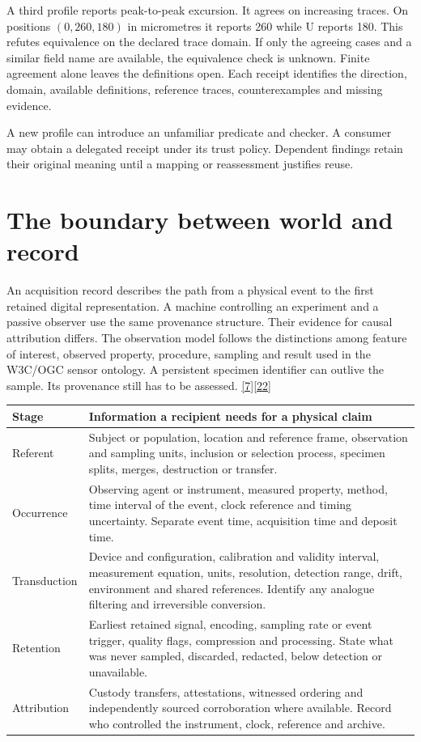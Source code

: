 \documentclass[11pt,a4paper]{article}
\newcommand{\partpage}[1]{\clearpage\section{#1}}
\newcommand{\src}[1]{\hyperlink{ref#1}{[#1]}}
\begin{document}
A third profile reports peak-to-peak excursion. It agrees on increasing traces. On positions $(0,260,180)$ in micrometres it reports 260 while U reports 180. This refutes equivalence on the declared trace domain. If only the agreeing cases and a similar field name are available, the equivalence check is unknown. Finite agreement alone leaves the definitions open. Each receipt identifies the direction, domain, available definitions, reference traces, counterexamples and missing evidence.

A new profile can introduce an unfamiliar predicate and checker. A consumer may obtain a delegated receipt under its trust policy. Dependent findings retain their original meaning until a mapping or reassessment justifies reuse.

\partpage{The boundary between world and record}
An acquisition record describes the path from a physical event to the first retained digital representation. A machine controlling an experiment and a passive observer use the same provenance structure. Their evidence for causal attribution differs. The observation model follows the distinctions among feature of interest, observed property, procedure, sampling and result used in the W3C/OGC sensor ontology. A persistent specimen identifier can outlive the sample. Its provenance still has to be assessed. \src{7}\src{22}

\small
\begin{tabularx}{\linewidth}{@{}L{.21\linewidth}Y@{}}
\toprule
\textbf{Stage} & \textbf{Information a recipient needs for a physical claim} \\ \midrule
Referent & Subject or population, location and reference frame, observation and sampling units, inclusion or selection process, specimen splits, merges, destruction or transfer. \\
Occurrence & Observing agent or instrument, measured property, method, time interval of the event, clock reference and timing uncertainty. Separate event time, acquisition time and deposit time. \\
Transduction & Device and configuration, calibration and validity interval, measurement equation, units, resolution, detection range, drift, environment and shared references. Identify any analogue filtering and irreversible conversion. \\
Retention & Earliest retained signal, encoding, sampling rate or event trigger, quality flags, compression and processing. State what was never sampled, discarded, redacted, below detection or unavailable. \\
Attribution & Custody transfers, attestations, witnessed ordering and independently sourced corroboration where available. Record who controlled the instrument, clock, reference and archive. \\
\bottomrule
\end{tabularx}
\normalsize
\end{document}
